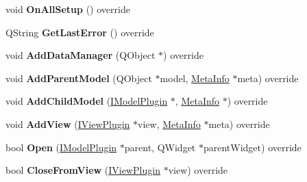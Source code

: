\begin{DoxyCompactItemize}
\item 
void {\bfseries On\+All\+Setup} () override\hypertarget{class_task_sketch_model_af1c56b3d144468266b5c82297b83852f}{}\label{class_task_sketch_model_af1c56b3d144468266b5c82297b83852f}

\item 
Q\+String {\bfseries Get\+Last\+Error} () override\hypertarget{class_task_sketch_model_a683fcebcaa91cce32a9dbdde28ea249f}{}\label{class_task_sketch_model_a683fcebcaa91cce32a9dbdde28ea249f}

\item 
void {\bfseries Add\+Data\+Manager} (Q\+Object $\ast$) override\hypertarget{class_task_sketch_model_aa5239531a2b064abdb3c06efbe544c38}{}\label{class_task_sketch_model_aa5239531a2b064abdb3c06efbe544c38}

\item 
void {\bfseries Add\+Parent\+Model} (Q\+Object $\ast$model, \hyperlink{struct_meta_info}{Meta\+Info} $\ast$meta) override\hypertarget{class_task_sketch_model_afae4e68a00b9efbf5f0cff3aea17412a}{}\label{class_task_sketch_model_afae4e68a00b9efbf5f0cff3aea17412a}

\item 
void {\bfseries Add\+Child\+Model} (\hyperlink{class_i_model_plugin}{I\+Model\+Plugin} $\ast$, \hyperlink{struct_meta_info}{Meta\+Info} $\ast$) override\hypertarget{class_task_sketch_model_a3a87e79c34a0e67bf1027fffedb43bc4}{}\label{class_task_sketch_model_a3a87e79c34a0e67bf1027fffedb43bc4}

\item 
void {\bfseries Add\+View} (\hyperlink{class_i_view_plugin}{I\+View\+Plugin} $\ast$view, \hyperlink{struct_meta_info}{Meta\+Info} $\ast$meta) override\hypertarget{class_task_sketch_model_a7febb27374b155e86d33543adc350c36}{}\label{class_task_sketch_model_a7febb27374b155e86d33543adc350c36}

\item 
bool {\bfseries Open} (\hyperlink{class_i_model_plugin}{I\+Model\+Plugin} $\ast$parent, Q\+Widget $\ast$parent\+Widget) override\hypertarget{class_task_sketch_model_ace37e6001318e699bdd1a1412628ea90}{}\label{class_task_sketch_model_ace37e6001318e699bdd1a1412628ea90}

\item 
bool {\bfseries Close\+From\+View} (\hyperlink{class_i_view_plugin}{I\+View\+Plugin} $\ast$view) override\hypertarget{class_task_sketch_model_a32efbd8dbe71476b9ea223f330ff6cc8}{}\label{class_task_sketch_model_a32efbd8dbe71476b9ea223f330ff6cc8}


\end{DoxyCompactItemize}
